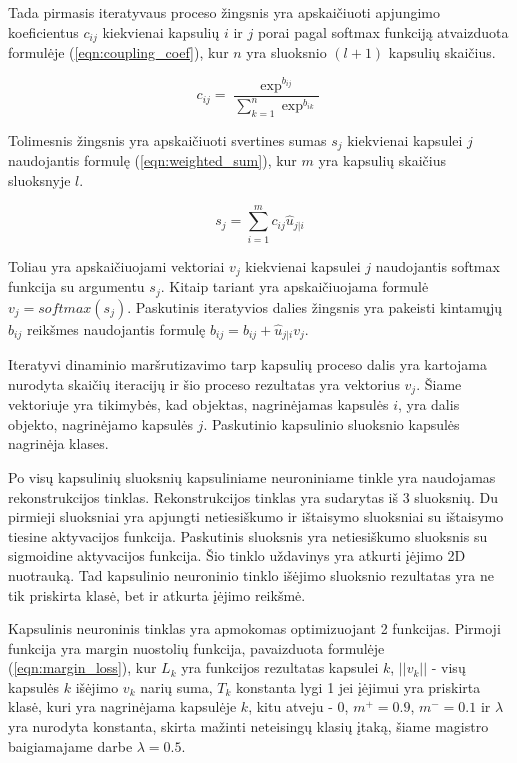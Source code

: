 Tada pirmasis iteratyvaus proceso žingsnis yra apskaičiuoti apjungimo koeficientus $c_{ij}$ kiekvienai kapsulių $i$ ir $j$ porai pagal softmax funkciją atvaizduota formulėje (\ref{eqn:coupling_coef}), kur $n$ yra sluoksnio $(l + 1)$ kapsulių skaičius.

\begin{equation}
\label{eqn:coupling_coef}
	c_{ij} = \dfrac{\exp^{b_{ij}}}{\sum_{k = 1}^{n} \exp^{b_{ik}}}
\end{equation}

Tolimesnis žingsnis yra apskaičiuoti svertines sumas $s_j$ kiekvienai kapsulei $j$ naudojantis formulę (\ref{eqn:weighted_sum}), kur $m$ yra kapsulių skaičius sluoksnyje $l$.

\begin{equation}
\label{eqn:weighted_sum}
	s_{j} = \sum_{i = 1}^{m} c_{ij} \hat{u}_{j|i}
\end{equation}

Toliau yra apskaičiuojami vektoriai $v_j$ kiekvienai kapsulei $j$ naudojantis softmax funkcija su argumentu $s_j$. Kitaip tariant yra apskaičiuojama formulė $v_j = softmax(s_j)$. Paskutinis iteratyvios dalies žingsnis yra pakeisti kintamųjų $b_{ij}$ reikšmes naudojantis formulę $b_{ij} = b_{ij} + \hat{u}_{j|i} v_j$.

Iteratyvi dinaminio maršrutizavimo tarp kapsulių proceso dalis yra kartojama nurodyta skaičių iteracijų ir šio proceso rezultatas yra vektorius $v_j$. Šiame vektoriuje yra tikimybės, kad objektas, nagrinėjamas kapsulės $i$, yra dalis objekto, nagrinėjamo kapsulės $j$. Paskutinio kapsulinio sluoksnio kapsulės nagrinėja klases.

Po visų kapsulinių sluoksnių kapsuliniame neuroniniame tinkle yra naudojamas rekonstrukcijos tinklas. Rekonstrukcijos tinklas yra sudarytas iš 3 sluoksnių. Du pirmieji sluoksniai yra apjungti netiesiškumo ir ištaisymo sluoksniai su ištaisymo tiesine aktyvacijos funkcija. Paskutinis sluoksnis yra netiesiškumo sluoksnis  su sigmoidine aktyvacijos funkcija. Šio tinklo uždavinys yra atkurti įėjimo 2D nuotrauką. Tad kapsulinio neuroninio tinklo išėjimo sluoksnio rezultatas yra ne tik priskirta klasė, bet ir atkurta įėjimo reikšmė.

Kapsulinis neuroninis tinklas yra apmokomas optimizuojant 2 funkcijas. Pirmoji funkcija yra margin nuostolių funkcija, pavaizduota formulėje (\ref{eqn:margin_loss}), kur $L_k$ yra funkcijos rezultatas kapsulei $k$, $||v_k||$ - visų kapsulės $k$ išėjimo $v_k$ narių suma, $T_k$ konstanta lygi 1 jei įėjimui yra priskirta klasė, kuri yra nagrinėjama kapsulėje $k$, kitu atveju - 0, $m^+ = 0.9$, $m^- = 0.1$ ir $\lambda$ yra nurodyta konstanta, skirta mažinti neteisingų klasių įtaką, šiame magistro baigiamajame darbe $\lambda = 0.5$.


